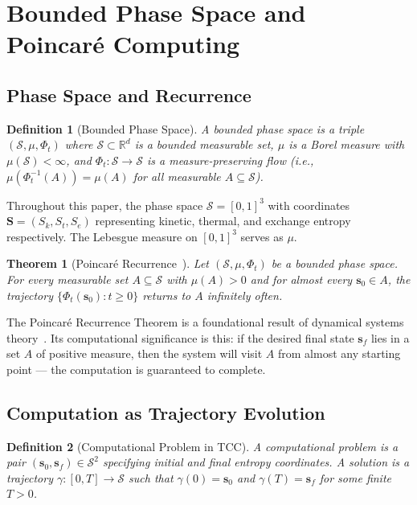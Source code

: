 \documentclass[12pt,twocolumn]{article}
\newtheorem{theorem}{Theorem}[section]
\newtheorem{definition}{Definition}[section]
\begin{document}
\section{Bounded Phase Space and Poincaré Computing}
\label{sec:poincare}

\subsection{Phase Space and Recurrence}

\begin{definition}[Bounded Phase Space]
A \emph{bounded phase space} is a triple $(\mathcal{S}, \mu, \Phi_t)$ where $\mathcal{S} \subset \mathbb{R}^d$ is a bounded measurable set, $\mu$ is a Borel measure with $\mu(\mathcal{S}) < \infty$, and $\Phi_t: \mathcal{S} \to \mathcal{S}$ is a measure-preserving flow (i.e., $\mu(\Phi_t^{-1}(A)) = \mu(A)$ for all measurable $A \subseteq \mathcal{S}$).
\end{definition}

Throughout this paper, the phase space $\mathcal{S} = [0,1]^3$ with coordinates $\mathbf{S} = (S_k, S_t, S_e)$ representing kinetic, thermal, and exchange entropy respectively. The Lebesgue measure on $[0,1]^3$ serves as $\mu$.

\begin{theorem}[Poincaré Recurrence~\cite{poincare1890probleme}]
\label{thm:poincare_recurrence}
Let $(\mathcal{S}, \mu, \Phi_t)$ be a bounded phase space. For every measurable set $A \subseteq \mathcal{S}$ with $\mu(A) > 0$ and for almost every $\mathbf{s}_0 \in A$, the trajectory $\{\Phi_t(\mathbf{s}_0) : t \geq 0\}$ returns to $A$ infinitely often.
\end{theorem}

The Poincaré Recurrence Theorem is a foundational result of dynamical systems theory~\cite{birkhoff1931proof,walters1982introduction}. Its computational significance is this: if the desired final state $\mathbf{s}_f$ lies in a set $A$ of positive measure, then the system will visit $A$ from almost any starting point --- the computation is guaranteed to complete.

\subsection{Computation as Trajectory Evolution}

\begin{definition}[Computational Problem in TCC]
A \emph{computational problem} is a pair $(\mathbf{s}_0, \mathbf{s}_f) \in \mathcal{S}^2$ specifying initial and final entropy coordinates. A \emph{solution} is a trajectory $\gamma: [0, T] \to \mathcal{S}$ such that $\gamma(0) = \mathbf{s}_0$ and $\gamma(T) = \mathbf{s}_f$ for some finite $T > 0$.
\end{definition}
\end{document}
